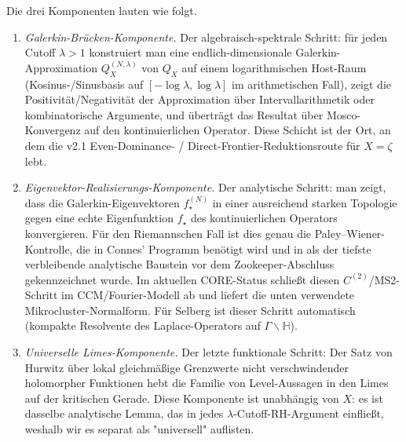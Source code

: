 \documentclass[11pt]{article}
\theoremstyle{definition}
\theoremstyle{remark}
\begin{document}
Die drei Komponenten lauten wie folgt.

\begin{enumerate}
\item[\textbf{(GBC)}] \emph{Galerkin-Brücken-Komponente.} Der
algebraisch-spektrale Schritt: für jeden Cutoff $\lambda > 1$ konstruiert
man eine endlich-dimensionale Galerkin-Approximation $Q_X^{(N,\lambda)}$
von $Q_X$ auf einem logarithmischen Host-Raum (Kosinus-/Sinusbasis auf
$[-\log\lambda,\log\lambda]$ im arithmetischen Fall), zeigt die
Positivität/Negativität der Approximation über Intervallarithmetik
oder kombinatorische Argumente, und überträgt das Resultat über Mosco-Konvergenz
\cite{MetaGalerkinBridge,ConnesConsaniMoscovici2025} auf den kontinuierlichen Operator.
  Diese Schicht ist der Ort, an dem die v2.1 Even-Dominance- /
  Direct-Frontier-Reduktionsroute \cite{Geiger2026RHII} für
  $X = \zeta$ lebt.

\item[$\boldsymbol{C^{(2)}}$] \emph{Eigenvektor-Realisierungs-Komponente.} Der analytische
Schritt: man zeigt, dass die Galerkin-Eigenvektoren $f_\star^{(N)}$ in einer
ausreichend starken Topologie gegen eine echte Eigenfunktion $f_\star$ des kontinuierlichen
Operators konvergieren. Für den Riemannschen Fall ist dies genau die Paley--Wiener-Kontrolle,
die in Connes' Programm benötigt wird
\cite{Connes2026,ConnesConsaniMoscovici2025} und in \cite{Geiger2026RHII}
als der tiefste verbleibende analytische Baustein vor dem Zookeeper-Abschluss gekennzeichnet
wurde. Im aktuellen CORE-Status schließt \cite{Zookeeper2026} diesen
$C^{(2)}$/MS2-Schritt im CCM/Fourier-Modell ab und liefert die unten
verwendete Mikrocluster-Normalform. Für Selberg ist dieser Schritt automatisch (kompakte Resolvente
des Laplace-Operators auf $\Gamma\backslash\mathbb{H}$).

\item[\textbf{(Hurwitz)}] \emph{Universelle Limes-Komponente.} Der
letzte funktionale Schritt: Der Satz von Hurwitz über lokal gleichmäßige Grenzwerte
nicht verschwindender holomorpher Funktionen hebt die Familie von
Level-Aussagen in den Limes auf der kritischen Gerade. Diese
Komponente ist unabhängig von $X$: es ist dasselbe analytische Lemma,
das in jedes $\lambda$-Cutoff-RH-Argument einfließt, weshalb wir es
separat als "universell" auflisten.
\end{enumerate}
\end{document}
